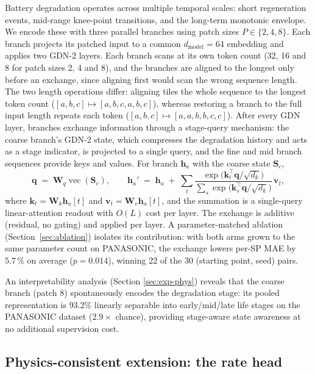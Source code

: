 \documentclass[final,5p,times,twocolumn]{elsarticle}
\begin{document}
Battery degradation operates across multiple temporal scales: short
regeneration events, mid-range knee-point transitions, and the
long-term monotonic envelope. We encode these with three parallel
branches using patch sizes $P \in \{2,4,8\}$. Each branch projects its
patched input to a common $d_{\text{model}}=64$ embedding and applies
two GDN-2 layers. Each branch scans at its own token count (32, 16 and
8 for patch sizes 2, 4 and 8), and the branches are aligned to the
longest only before an exchange, since aligning first would scan the
wrong sequence length. The two length operations differ: aligning tiles
the whole sequence to the longest token count
($[a,b,c]\mapsto[a,b,c,a,b,c]$), whereas restoring a branch to the full
input length repeats each token ($[a,b,c]\mapsto[a,a,b,b,c,c]$).
After every GDN layer, branches exchange
information through a stage-query mechanism: the coarse branch's
GDN-2 state, which compresses the degradation history and acts as a
stage indicator, is projected to a single query, and the fine and
mid branch sequences provide keys and values. For branch
$\mathbf{h}_a$ with the coarse state $\mathbf{S}_c$,
\begin{equation}
\label{eq:stagequery}
\mathbf{q} \;=\; \mathbf{W}_q \operatorname{vec}(\mathbf{S}_c),
\qquad
\mathbf{h}_a' \;=\; \mathbf{h}_a \;+\;
\sum_{t} \frac{\exp\!\big(\mathbf{k}_t^{\top}\mathbf{q}/\sqrt{d_k}\big)}
{\sum_{s} \exp\!\big(\mathbf{k}_s^{\top}\mathbf{q}/\sqrt{d_k}\big)}
\,\mathbf{v}_t,
\end{equation}
where $\mathbf{k}_t = \mathbf{W}_k \mathbf{h}_a[t]$ and
$\mathbf{v}_t = \mathbf{W}_v \mathbf{h}_a[t]$, and the summation is a
single-query linear-attention readout with $O(L)$ cost per layer.
The exchange is additive (residual, no gating) and applied
per layer. A parameter-matched ablation
(Section~\ref{sec:ablation}) isolates its contribution: with both arms
grown to the same parameter count on PANASONIC, the exchange lowers
per-SP MAE by $5.7\,\%$ on average ($p=0.014$), winning $22$ of the $30$
(starting point, seed) pairs.

An interpretability analysis (Section \ref{sec:exp-phys}) reveals that
the coarse branch (patch 8) spontaneously encodes the degradation
stage: its pooled representation is $93.2\%$ linearly separable into
early/mid/late life stages on the PANASONIC dataset ($2.9\times$
chance), providing stage-aware state awareness at no additional
supervision cost.

\subsection{Physics-consistent extension: the rate head}
\label{sec:rate-head}
\end{document}
